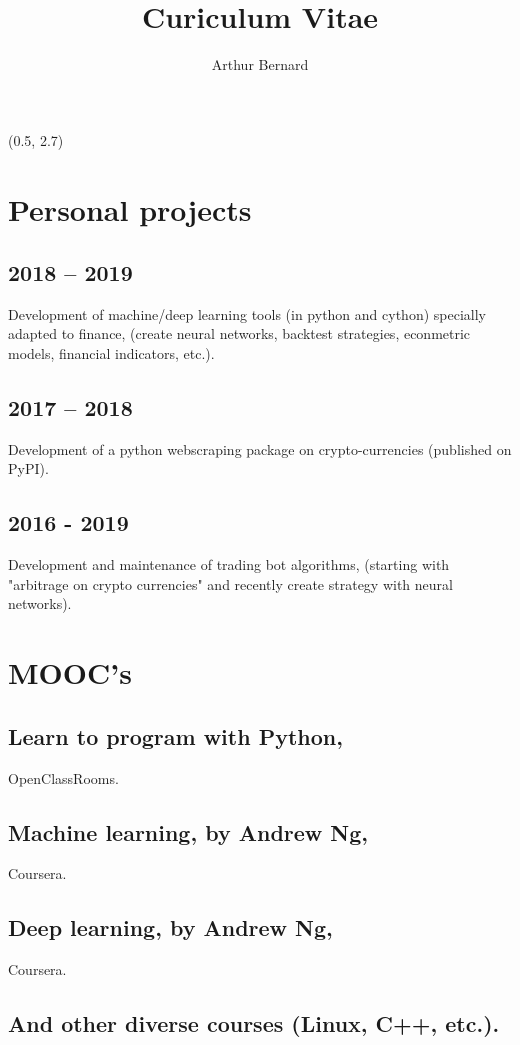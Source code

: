 \documentclass[a4paper,11pt]{arthur-cv}
\title{Curiculum Vitae}
\author{Arthur Bernard}
\begin{document}
\makeprofile %

\begin{textblock}{17}(0.5, 2.7)

  \begin{minipage}[t]{0.33\textwidth}
  
    \section{Personal projects}
      \subsection{2018 – 2019}{Development of  machine/deep learning  tools (in python and cython) specially adapted to finance, (create neural networks, backtest strategies, econmetric models, financial indicators, etc.).}
      \subsection{2017 – 2018}{Development of a python webscraping package on crypto-currencies (published on PyPI).}
      \subsection{2016 - 2019}{Development and maintenance of trading bot algorithms, (starting with "arbitrage on crypto currencies" and recently create strategy with neural networks).}


    \section{MOOC's}
      \subsection{Learn to program with Python,}{OpenClassRooms.}
      \subsection{Machine learning, by Andrew Ng,}{Coursera.}
      \subsection{Deep learning, by Andrew Ng,}{Coursera.}
      \subsection{And other diverse courses (Linux, C++, etc.).}


\end{minipage}
\end{textblock}
\end{document}
